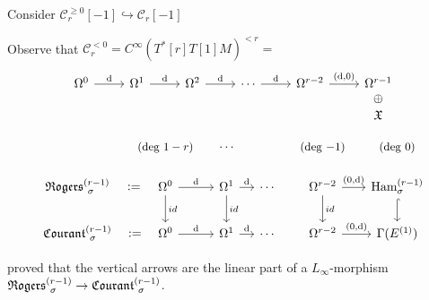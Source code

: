 \documentclass[beamer,10pt]{standalone}
\begin{document}
\begin{frame}
	Consider $\mathcal{C}_r^{\geq 0}[-1] \hookrightarrow \mathcal{C}_r[-1]$
	\vfill

	Observe that $\mathcal{C}_r^{<0} = C^\infty(T^*[r]T[1]M)^{<r}=$
	\begin{displaymath}
		\begin{tikzcd}[ampersand replacement=\&]
			\Omega^0 \ar[r,"\d"]\&
			\Omega^1 \ar[r,"\d"]\&
			\Omega^2 \ar[r,"\d"]\&
			\cdots \ar[r,"\d"]\&
			\Omega^{r-2} \ar[r,"{(\d,0)}"]\&
			\Omega^{r-1}\ar[d,phantom,"\oplus"]\\[-.7em]
			\&\&\&\&\&\X
 		\end{tikzcd}
	\end{displaymath}
	\vfill

	\begin{displaymath}
		\begin{tikzcd}[ampersand replacement=\&,column sep = small]
			\& \text{\small (deg $1-r$)} \& \cdots \& \&\text{\small (deg $-1$)} \& \text{\small (deg $0$)} \\[-.5em]
			\Rogers[\sigma]{r-1}   \ar[r,phantom,":="]
			\&
			\Omega^0 \ar[r,"{\d}"] \ar[d,"id"]
			\&
			\Omega^1 \ar[r,"{\d}"] \ar[d,"id"]
			\&
			\cdots
			\&
			\Omega^{r-2} \ar[r,"{(0,\d)}"] \ar[d,"id"]
			\& \Ham_{\sigma}^{(r-1)} \ar[d,hook]
			\\
			\Courant[\sigma]{r-1} \ar[r,phantom,":="]
			\&
			\Omega^0 \ar[r,"{\d}"]
			\&
			\Omega^1 \ar[r,"{\d}"] 
			\&
			\cdots
			\&
			\Omega^{r-2} \ar[r,"{(0,\d)}"]
			\& \Gamma(E^{(1)})
		\end{tikzcd}
	\end{displaymath}
	\vfill

	\cite{Miti2021} proved that the vertical arrows are the linear part of a $L_\infty$-morphism $\Rogers[\sigma]{r-1} \to \Courant[\sigma]{r-1}$.
\end{frame}
\end{document}
